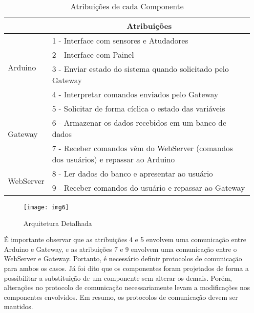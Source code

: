 			\begin{table}[!htb]
				\centering
				\captionsetup{justification=centering}
				\caption[Atribuições de cada Componente]{Atribuições de cada Componente}
				\label{tbl4}
				\def\arraystretch{1.5}
				\begin{tabular}{m{2cm}| p{12cm}}
					& \multicolumn{1}{c}{\textbf{Atribuições}} \\ \hline
					
					\multirow{4}{*}{Arduino} 
					& 1 - Interface com sensores e Atudadores \\
					& 2 - Interface com Painel \\
					& 3 - Enviar estado do sistema quando solicitado pelo Gateway\\
					& 4 - Interpretar comandos enviados pelo Gateway \\ \hline
					
					\multirow{3}{*}{Gateway} & 5 - Solicitar de forma cíclica o estado das variáveis \\
					& 6 - Armazenar os dados recebidos em um banco de dados \\
					& 7 - Receber comandos vêm do WebServer (comandos dos usuários) e repassar ao Arduino \\ \hline
					
					\multirow{2}{*}{WebServer} & 8 - Ler dados do banco e apresentar ao usuário \\
					& 9 - Receber comandos do usuário e repassar ao Gateway \\
						
					\hline
				\end{tabular}
			\end{table}
			
			\begin{figure}[!htb]	
				\captionsetup{justification=centering}
				\begin{center}
					\texttt{[image: img6]}  %
					\caption[Arquitetura Detalhada]{\label{img6} Arquitetura Detalhada }
				\end{center}		
			\end{figure}
		
			É importante observar que as atribuições 4 e 5 envolvem uma comunicação entre Arduino e Gateway, e as atribuições 7 e 9 envolvem uma comunicação entre o WebServer e Gateway. Portanto, é necessário definir protocolos de comunicação para ambos os casos. Já foi dito que os componentes foram projetados de forma a possibilitar a substituição de um componente sem alterar os demais. Porém, alterações no protocolo de comunicação necessariamente levam a modificações nos componentes envolvidos. Em resumo, os protocolos de comunicação devem ser mantidos.
			
